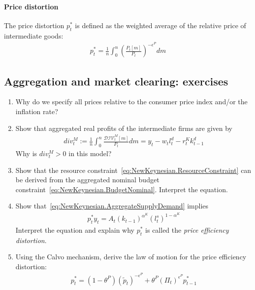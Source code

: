 \paragraph{Price distortion}
The price distortion \(p_{t}^*\) is defined as the weighted average of the relative price of intermediate goods:
\begin{align}
p_{t}^{*} = \frac{1}{n} \int_{0}^{n} {\left(\frac{P_{t}[m]}{P_{t}}\right)}^{-\epsilon^{P}} dm \label{eq:NewKeynesian.PriceDistortionDefinition}
\end{align}

\subsection{Aggregation and market clearing: exercises}

\begin{enumerate}[resume]

\item
Why do we specify all prices relative to the consumer price index and/or the inflation rate?
  
\item
Show that aggregated real profits of the intermediate firms are given by
\begin{align}
div^{M}_{t} := \frac{1}{n} \int_{0}^{n} \frac{\mathcal{DIV}^{M}_{t}[m]}{P_{t}} dm = y_t - w_t l^{d}_{t} - r^{K}_{t} k^{d}_{t-1} \label{eq:NewKeynesian.IntermediateFirms.AggregateProfits}
\end{align}
Why is \(div^{M}_{t}>0\) in this model?

\item
Show that the resource constraint~\eqref{eq:NewKeynesian.ResourceConstraint} can be derived
  from the aggregated nominal budget constraint~\eqref{eq:NewKeynesian.BudgetNominal}.
Interpret the equation.

\item
Show that~\eqref{eq:NewKeynesian.AggregateSupplyDemand} implies
\begin{align}
p_{t}^{*} y_t = A_t {(k_{t-1})}^{\alpha^{K}} {(l^{s}_{t})}^{1-\alpha^{K}} \label{eq:NewKeynesian.AggregateSupply}
\end{align}
Interpret the equation and explain why \(p_{t}^{*}\) is called the \emph{price efficiency distortion}.

\item
Using the Calvo mechanism, derive the law of motion for the price efficiency distortion:
\begin{align}
p_{t}^{*} = \left(1-\theta^{P}\right) {(\widetilde{p}_{t})}^{-\epsilon^{P}} + \theta^{P} {(\Pi_{t})}^{\epsilon^{P}} p_{t-1}^{*} \label{eq:NewKeynesian.PriceDistortionLoM}
\end{align}

\end{enumerate}


